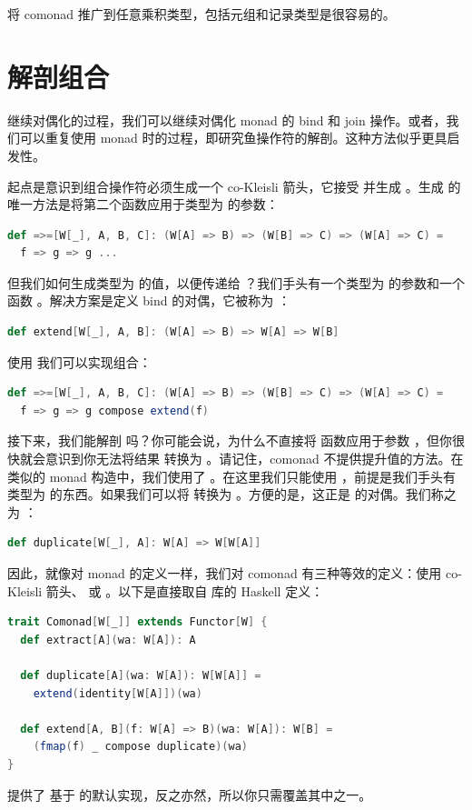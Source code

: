 将  comonad 推广到任意乘积类型，包括元组和记录类型是很容易的。

\section{解剖组合}

继续对偶化的过程，我们可以继续对偶化 monad 的 bind 和 join 操作。或者，我们可以重复使用 monad 时的过程，即研究鱼操作符的解剖。这种方法似乎更具启发性。

起点是意识到组合操作符必须生成一个 co-Kleisli 箭头，它接受  并生成 。生成  的唯一方法是将第二个函数应用于类型为  的参数：

\begin{lstlisting}[language=Scala]
def =>=[W[_], A, B, C]: (W[A] => B) => (W[B] => C) => (W[A] => C) =
  f => g => g ...
\end{lstlisting}
但我们如何生成类型为  的值，以便传递给 ？我们手头有一个类型为  的参数和一个函数 。解决方案是定义 bind 的对偶，它被称为 ：

\begin{lstlisting}[language=Scala]
def extend[W[_], A, B]: (W[A] => B) => W[A] => W[B]
\end{lstlisting}
使用  我们可以实现组合：

\begin{lstlisting}[language=Scala]
def =>=[W[_], A, B, C]: (W[A] => B) => (W[B] => C) => (W[A] => C) =
  f => g => g compose extend(f)
\end{lstlisting}
接下来，我们能解剖  吗？你可能会说，为什么不直接将  函数应用于参数 ，但你很快就会意识到你无法将结果  转换为 。请记住，comonad 不提供提升值的方法。在类似的 monad 构造中，我们使用了 。在这里我们只能使用 ，前提是我们手头有类型为  的东西。如果我们可以将  转换为 。方便的是，这正是  的对偶。我们称之为 ：

\begin{lstlisting}[language=Scala]
def duplicate[W[_], A]: W[A] => W[W[A]]
\end{lstlisting}
因此，就像对 monad 的定义一样，我们对 comonad 有三种等效的定义：使用 co-Kleisli 箭头、 或 。以下是直接取自  库的 Haskell 定义：

\begin{lstlisting}[language=Scala]
trait Comonad[W[_]] extends Functor[W] {
  def extract[A](wa: W[A]): A

  def duplicate[A](wa: W[A]): W[W[A]] =
    extend(identity[W[A]])(wa)

  def extend[A, B](f: W[A] => B)(wa: W[A]): W[B] =
    (fmap(f) _ compose duplicate)(wa)
}
\end{lstlisting}
提供了  基于  的默认实现，反之亦然，所以你只需覆盖其中之一。

